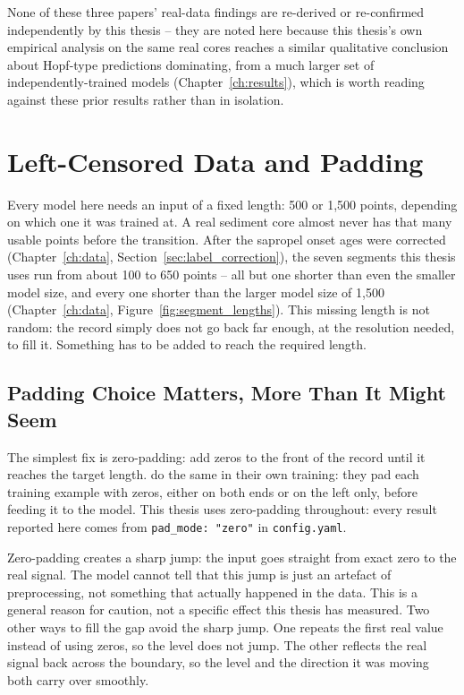 None of these three papers' real-data findings are re-derived or re-confirmed independently by this thesis -- they are noted here because this thesis's own empirical analysis on the same real cores reaches a similar qualitative conclusion about Hopf-type predictions dominating, from a much larger set of independently-trained models (Chapter~\ref{ch:results}), which is worth reading against these prior results rather than in isolation.

\section{Left-Censored Data and Padding}
\label{sec:padding_gap}
Every model here needs an input of a fixed length: 500 or 1{,}500 points, depending on which one it was trained at. A real sediment core almost never has that many usable points before the transition. After the sapropel onset ages were corrected (Chapter~\ref{ch:data}, Section~\ref{sec:label_correction}), the seven segments this thesis uses run from about 100 to 650 points -- all but one shorter than even the smaller model size, and every one shorter than the larger model size of 1{,}500 (Chapter~\ref{ch:data}, Figure~\ref{fig:segment_lengths}). This missing length is not random: the record simply does not go back far enough, at the resolution needed, to fill it. Something has to be added to reach the required length.

\subsection{Padding Choice Matters, More Than It Might Seem}
The simplest fix is zero-padding: add zeros to the front of the record until it reaches the target length. \citet{bury2021} do the same in their own training: they pad each training example with zeros, either on both ends or on the left only, before feeding it to the model. This thesis uses zero-padding throughout: every result reported here comes from \texttt{pad\_mode: "zero"} in \texttt{config.yaml}.

Zero-padding creates a sharp jump: the input goes straight from exact zero to the real signal. The model cannot tell that this jump is just an artefact of preprocessing, not something that actually happened in the data. This is a general reason for caution, not a specific effect this thesis has measured. Two other ways to fill the gap avoid the sharp jump. One repeats the first real value instead of using zeros, so the level does not jump. The other reflects the real signal back across the boundary, so the level and the direction it was moving both carry over smoothly.

